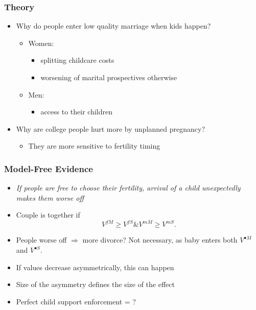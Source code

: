 \documentclass{beamer}
\begin{document}
\begin{frame}
\frametitle{Theory}
\begin{itemize}
\item Why do people enter low quality marriage when kids happen?
\begin{itemize}
\item Women: 
\begin{itemize}
\item splitting childcare costs
\item worsening of marital prospectives otherwise
\end{itemize}
\item Men:
\begin{itemize}
\item access to their children
\end{itemize}
\end{itemize}
\item Why are college people hurt more by unplanned pregnancy?
\begin{itemize}
\item They are more sensitive to fertility timing
\end{itemize}
\end{itemize}
\end{frame}

\begin{frame}
\frametitle{Model-Free Evidence}
\begin{itemize}
\item \textit{If people are free to choose their fertility, arrival of a child unexpectedly makes them worse off}
\item Couple is together if
\[V^{fM} \geq V^{fS} \& V^{mM} \geq V^{mS}.\]
\item People worse off $\Rightarrow$ more divorce? Not necessary, as baby enters both $V^{\bullet M}$ and $V^{\bullet S}$. 
\item If values decrease asymmetrically, this can happen
\item Size of the asymmetry defines the size of the effect
\item Perfect child support enforcement = ?
\end{itemize}
\end{frame}
\end{document}

